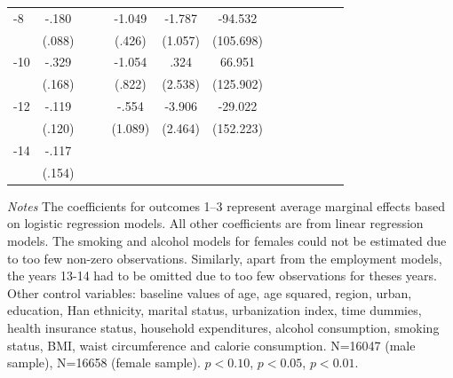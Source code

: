 \begin{table}[!ht]
\begin{adjustbox}{max width=\linewidth}
\begin{threeparttable}
{\begin{tabular}{l*{6}{S
S}}
-8             &    -.180\sym{**} &         &         &   -1.049\sym{**} &   -1.787\sym{*}  &  -94.532         \\
                &   (.088)         &         &         &   (.426)         &  (1.057)         &(105.698)         \\
-10            &    -.329\sym{*}  &         &         &   -1.054         &     .324         &   66.951         \\
                &   (.168)         &         &         &   (.822)         &  (2.538)         &(125.902)         \\
-12           &    -.119         &         &         &    -.554         &   -3.906         &  -29.022         \\
                &   (.120)         &         &         &  (1.089)         &  (2.464)         &(152.223)         \\
-14           &    -.117         &         &         &                  &                  &                  \\
                &   (.154)         &         &         &                  &                  &                  \\
\bottomrule
\end{tabular}
\begin{tablenotes}
\item \footnotesize \textit{Notes} The coefficients for outcomes 1--3 represent average marginal effects based on logistic regression models. All other coefficients are from linear regression models. The smoking and alcohol models for females could not be estimated due to too few non-zero observations. Similarly, apart from the employment models, the years 13-14 had to be omitted due to too few observations for theses years. Other control variables: baseline values of age, age squared, region, urban, education, Han ethnicity, marital status, urbanization index, time dummies, health insurance status, household expenditures, alcohol consumption, smoking status, BMI, waist circumference and calorie consumption. N=16047 (male sample), N=16658 (female sample). \sym{*} \(p<0.10\), \sym{**} \(p<0.05\), \sym{***} \(p<0.01\).
\end{tablenotes}
}
\end{threeparttable}
\end{adjustbox}
\end{table}


